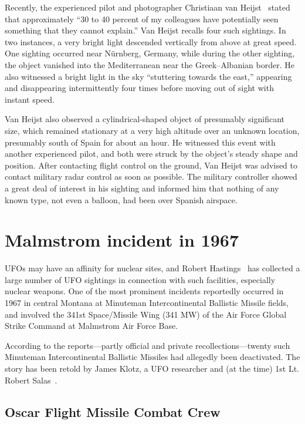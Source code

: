 Recently, the experienced pilot and photographer Christiaan van Heijst~\cite[time\,=\,4225\,s\,=\,1\,hr\,10\,min\,27\,s]{Heijst2023Feb} stated
that approximately ``30 to 40  percent of my colleagues have potentially seen something that they cannot explain.''
Van Heijst recalls four such sightings. In two instances, a very bright light descended vertically from above at great speed.
One sighting occurred near N\"urnberg, Germany,
while during the other sighting, the object vanished into the Mediterranean near the Greek--Albanian border.
He also witnessed a bright light in the sky ``stuttering towards the east,''
appearing and disappearing intermittently four times before moving out of sight with instant speed.

Van Heijst also observed a cylindrical-shaped object of presumably significant size, which remained stationary at a very high altitude over an unknown location, presumably south of Spain for about an hour.
He witnessed this event with another experienced pilot, and both were struck by the object's steady shape and position.
After contacting flight control on the ground, Van Heijst was advised to contact military radar control as soon as possible.
The military controller showed a great deal of interest in his sighting and informed him that nothing of any known type, not even a balloon, had been over Spanish airspace.

\section{Malmstrom incident in 1967}
\label{2023-UFO-chapter-History--1953-2016-dicbm1967}

UFOs may have an affinity for nuclear sites, and Robert Hastings~\cite{Hastings2008Jan}
has collected a large number of UFO sightings in connection with such facilities,
especially nuclear weapons.
One of the most prominent incidents reportedly occurred in 1967 in central Montana at Minuteman Intercontinental Ballistic Missile fields,
and involved the 341st Space/Missile Wing (341 MW) of the Air Force Global Strike Command at Malmstrom Air Force Base.

According to the reports---partly official and private recollections---twenty
such Minuteman Intercontinental Ballistic Missiles had allegedly been deactivated.
The story has been retold by James Klotz, a UFO researcher and
(at the time) 1st Lt. Robert Salas~\cite{Klotz-Salas-1996,Klotz2005Feb}.


\subsection{Oscar Flight Missile Combat Crew}

